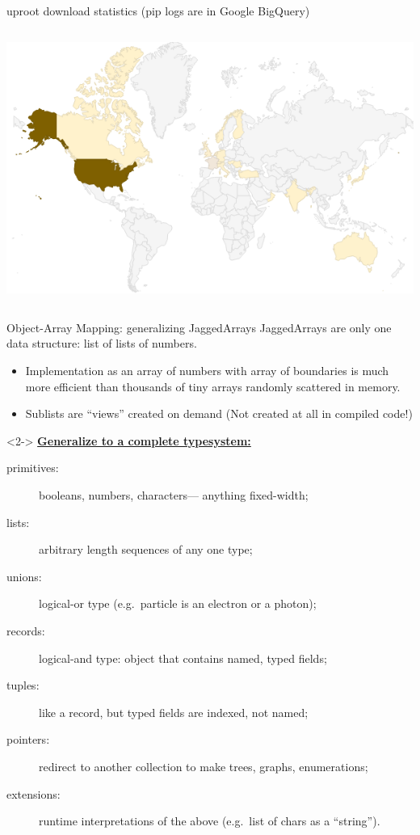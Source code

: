 \documentclass[aspectratio=169]{beamer}
\begin{document}
\begin{frame}{uproot download statistics (pip logs are in Google BigQuery)}
\begin{columns}
\includegraphics[width=\linewidth]{downloads-by-country-2.png}

\end{columns}
\end{frame}

\begin{frame}{Object-Array Mapping: generalizing JaggedArrays}
\vspace{0.5 cm}
JaggedArrays are only one data structure: list of lists of numbers.
\begin{itemize}
\item Implementation as an array of numbers with array of boundaries is much more efficient than thousands of tiny arrays randomly scattered in memory.
\item Sublists are ``views'' created on demand (Not created at all in compiled code!)
\end{itemize}

\begin{uncoverenv}<2->
\vspace{0.25 cm}
\underline{\bf Generalize to a complete typesystem:}
\begin{description}
\item[primitives:] booleans, numbers, characters--- anything fixed-width;
\item[lists:] arbitrary length sequences of any one type;
\item[unions:] logical-or type (e.g.\ particle is an electron or a photon);
\item[records:] logical-and type: object that contains named, typed fields;
\item[tuples:] like a record, but typed fields are indexed, not named;
\item[pointers:] redirect to another collection to make trees, graphs, enumerations;
\item[extensions:] runtime interpretations of the above (e.g.\ list of chars as a ``string'').
\end{description}
\end{uncoverenv}
\end{frame}
\end{document}

